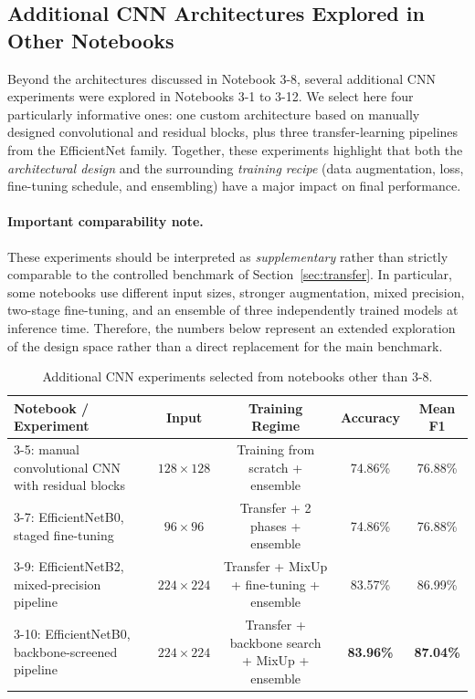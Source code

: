 \subsection{Additional CNN Architectures Explored in Other Notebooks}
\label{sec:other_cnn_architectures}

Beyond the architectures discussed in Notebook 3-8, several additional CNN experiments were explored in Notebooks 3-1 to 3-12. We select here four particularly informative ones: one custom architecture based on manually designed convolutional and residual blocks, plus three transfer-learning pipelines from the EfficientNet family. Together, these experiments highlight that both the \emph{architectural design} and the surrounding \emph{training recipe} (data augmentation, loss, fine-tuning schedule, and ensembling) have a major impact on final performance.

\paragraph{Important comparability note.} These experiments should be interpreted as \emph{supplementary} rather than strictly comparable to the controlled benchmark of Section~\ref{sec:transfer}. In particular, some notebooks use different input sizes, stronger augmentation, mixed precision, two-stage fine-tuning, and an ensemble of three independently trained models at inference time. Therefore, the numbers below represent an extended exploration of the design space rather than a direct replacement for the main benchmark.

\begin{table}[H]
\centering
\caption{Additional CNN experiments selected from notebooks other than 3-8.}
\label{tab:other_architectures_summary}
\begin{tabular}{lcccc}
\toprule
\textbf{Notebook / Experiment} & \textbf{Input} & \textbf{Training Regime} & \textbf{Accuracy} & \textbf{Mean F1} \\
\midrule
3-5: manual convolutional CNN with residual blocks & $128 \times 128$ & Training from scratch + ensemble & 74.86\% & 76.88\% \\
3-7: EfficientNetB0, staged fine-tuning & $96 \times 96$ & Transfer + 2 phases + ensemble & 74.86\% & 76.88\% \\
3-9: EfficientNetB2, mixed-precision pipeline & $224 \times 224$ & Transfer + MixUp + fine-tuning + ensemble & 83.57\% & 86.99\% \\
3-10: EfficientNetB0, backbone-screened pipeline & $224 \times 224$ & Transfer + backbone search + MixUp + ensemble & \textbf{83.96\%} & \textbf{87.04\%} \\
\bottomrule
\end{tabular}
\end{table}

